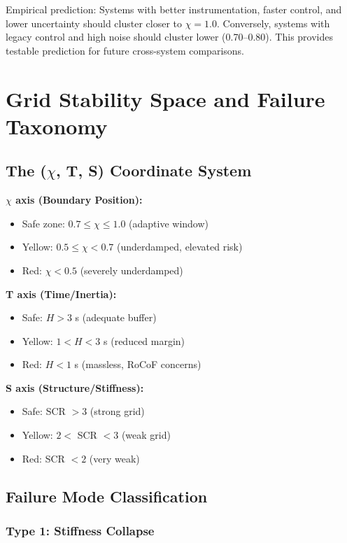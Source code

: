 \documentclass[11pt,letterpaper]{article}
\newcommand{\symchi}{\chi}
\begin{document}
Empirical prediction: Systems with better instrumentation, faster control, and lower uncertainty should cluster closer to $\chi = 1.0$. Conversely, systems with legacy control and high noise should cluster lower (0.70--0.80). This provides testable prediction for future cross-system comparisons.

\section{Grid Stability Space and Failure Taxonomy}

\subsection{The ($\symchi$, T, S) Coordinate System}

\textbf{$\symchi$ axis (Boundary Position):}
\begin{itemize}
\item Safe zone: $0.7 \le \symchi \le 1.0$ (adaptive window)
\item Yellow: $0.5 \le \symchi < 0.7$ (underdamped, elevated risk)
\item Red: $\symchi < 0.5$ (severely underdamped)
\end{itemize}

\textbf{T axis (Time/Inertia):}
\begin{itemize}
\item Safe: $H > 3$ s (adequate buffer)
\item Yellow: $1 < H < 3$ s (reduced margin)
\item Red: $H < 1$ s (massless, RoCoF concerns)
\end{itemize}

\textbf{S axis (Structure/Stiffness):}
\begin{itemize}
\item Safe: SCR $> 3$ (strong grid)
\item Yellow: $2 <$ SCR $< 3$ (weak grid)
\item Red: SCR $< 2$ (very weak)
\end{itemize}

\subsection{Failure Mode Classification}

\subsubsection{Type 1: Stiffness Collapse}
\end{document}
